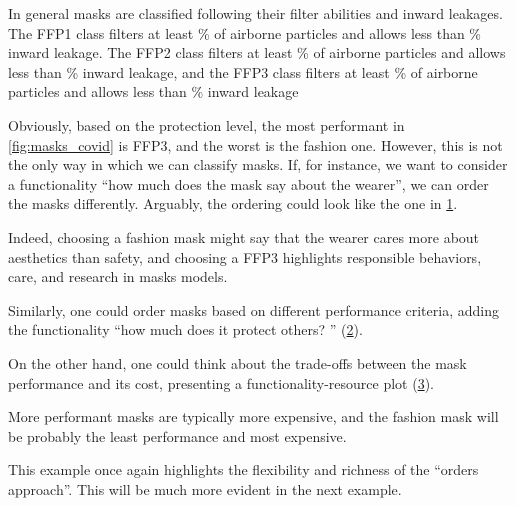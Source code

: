 In general masks are classified following their filter abilities and inward leakages.
The FFP1 class filters at least \unit[80]{\%} of airborne particles and allows less than \unit[22]{\%} inward leakage.
The FFP2 class filters at least \unit[96]{\%} of airborne particles and allows less than \unit[8]{\%} inward leakage, and the FFP3 class filters at least \unit[99]{\%} of airborne particles and allows less than \unit[2]{\%} inward leakage

Obviously, based on the protection level, the most performant in \cref{fig:masks_covid} is FFP3, and the worst is the fashion one.
However, this is not the only way in which we can classify masks.
If, for instance, we want to consider a functionality ``how much does the mask say about the wearer'', we can order the masks differently.
Arguably, the ordering could look like the one in \cref{fig:masks_expressive}.

\begin{figure}[h!]
    \centering
    \caption{}
    \label{fig:masks_expressive}
\end{figure}

Indeed, choosing a fashion mask might say that the wearer cares more about aesthetics than safety, and choosing a FFP3 highlights responsible behaviors, care, and research in masks models.

Similarly, one could order masks based on different performance criteria, adding the functionality ``how much does it protect others?
'' (\cref{fig:masks_others}).

\begin{figure}[h!]
    \centering
    \caption{}
    \label{fig:masks_others}
\end{figure}

On the other hand, one could think about the trade-offs between the mask performance and its cost, presenting a functionality-resource plot (\cref{fig:masks_price}).

\begin{figure}[h!]
    \centering
    \caption{}
    \label{fig:masks_price}
\end{figure}

More performant masks are typically more expensive, and the fashion mask will be probably the least performance and most expensive.

This example once again highlights the flexibility and richness of the ``orders approach''.
This will be much more evident in the next example.


